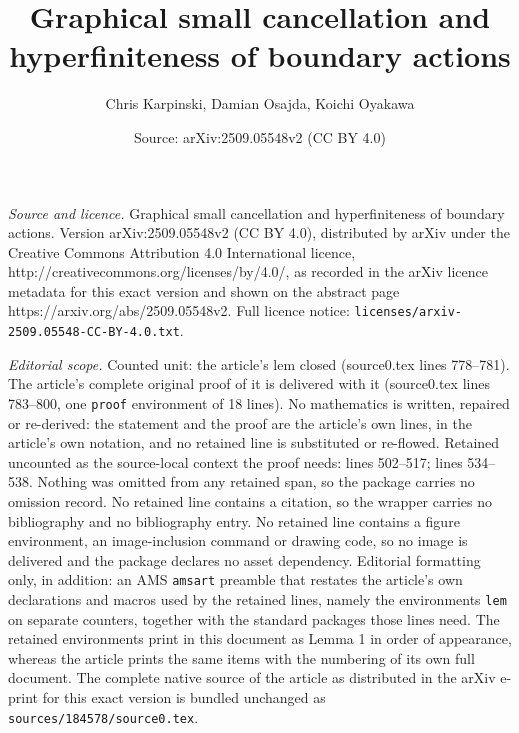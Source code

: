 \documentclass[10pt,a4paper]{amsart}
\title{Graphical small cancellation and hyperfiniteness of boundary actions}
\author{Chris Karpinski, Damian Osajda, Koichi Oyakawa}
\date{Source: arXiv:2509.05548v2 (CC BY 4.0)}
\begin{document}
\maketitle

\noindent\emph{Source and licence.} Graphical small cancellation and hyperfiniteness of boundary actions. Version arXiv:2509.05548v2 (CC BY 4.0), distributed by arXiv under the Creative Commons Attribution 4.0 International licence, http://creativecommons.org/licenses/by/4.0/, as recorded in the arXiv licence metadata for this exact version and shown on the abstract page https://arxiv.org/abs/2509.05548v2. Full licence notice: \texttt{licenses/arxiv-2509.05548-CC-BY-4.0.txt}.\par\smallskip

\noindent\textit{Editorial scope.} Counted unit: the article's lem closed (source0.tex lines 778--781). The article's complete original proof of it is delivered with it (source0.tex lines 783--800, one \texttt{proof} environment of 18 lines). No mathematics is written, repaired or re-derived: the statement and the proof are the article's own lines, in the article's own notation, and no retained line is substituted or re-flowed.  Retained uncounted as the source-local context the proof needs: lines 502--517; lines 534--538.  Nothing was omitted from any retained span, so the package carries no omission record.  No retained line contains a citation, so the wrapper carries no bibliography and no bibliography entry.  No retained line contains a figure environment, an image-inclusion command or drawing code, so no image is delivered and the package declares no asset dependency.  Editorial formatting only, in addition: an AMS \texttt{amsart} preamble that restates the article's own declarations and macros used by the retained lines, namely the environments \texttt{lem} on separate counters, together with the standard packages those lines need.  The retained environments print in this document as Lemma 1 in order of appearance, whereas the article prints the same items with the numbering of its own full document.  The complete native source of the article as distributed in the arXiv e-print for this exact version is bundled unchanged as \texttt{sources/184578/source0.tex}.
\end{document}
